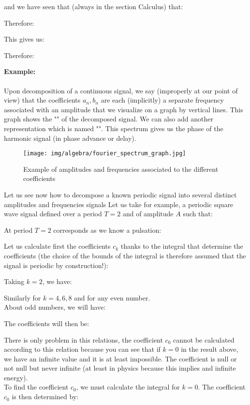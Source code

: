 	and we have seen that (always in the section Calculus) that:
	
	Therefore:
	
	This gives us:
	
	Therefore:
	
	\begin{tcolorbox}[colframe=black,colback=white,sharp corners]
	\textbf{{\Large {}}Example:}\\\\
	Upon decomposition of a continuous signal, we say (improperly at our point of view) that the coefficients $a_n,b_n$ are each (implicitly) a separate frequency associated with an amplitude that we visualize on a graph by vertical lines. This graph shows the "" of the decomposed signal. We can also add another representation which is named "". This spectrum gives us the phase of the harmonic signal (in phase advance or delay).
	\begin{figure}[H]
		\centering
		\texttt{[image: img/algebra/fourier\_spectrum\_graph.jpg]}
		\caption{Example of amplitudes and frequencies associated to the different coefficients}
	\end{figure}
	Let us see now how to decompose a known periodic signal into several distinct amplitudes and frequencies signals
	Let us take for example, a periodic square wave signal defined over a period $T = 2$ and of amplitude $A$ such that:
	
	At period $T = 2$ corresponds as we know a pulsation:
	
	\end{tcolorbox}
	
	\pagebreak
	\begin{tcolorbox}[colframe=black,colback=white,sharp corners]
	Let us calculate first the coefficients $c_k$ thanks to the integral that determine the coefficients (the choice of the bounds of the integral is therefore assumed that the signal is periodic by construction!):
	
	Taking $k = 2$, we have:
	
	Similarly for $k = 4,6,8$ and for any even number.\\
	
	About odd numbers, we will have:
	
	The coefficients will then be:
	
	There is only problem in this relations, the coefficient $c_0$ cannot be calculated according to this relation because you can see that if $k = 0$ in the result above, we have an infinite value and it is at least impossible. The coefficient is null or not null  but never infinite (at least in physics because this implies and infinite energy).\\
	
	To find the coefficient $c_0$, we must calculate the integral for $k = 0$. The coefficient $c_0$ is then determined by:
	
	\end{tcolorbox}
	
